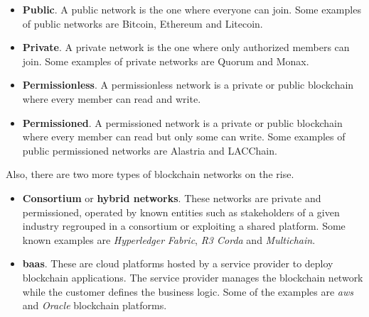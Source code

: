 \begin{itemize}
    \item \textbf{Public}. A public network is the one where everyone can join. Some examples of public networks are Bitcoin, Ethereum and Litecoin.
    \item \textbf{Private}. A private network is the one where only authorized members can join. Some examples of private networks are Quorum and Monax.
    \item \textbf{Permissionless}. A permissionless network is a private or public blockchain where every member can read and write.
    \item \textbf{Permissioned}. A permissioned network is a private or public blockchain where every member can read but only some can write. Some examples of public permissioned networks are Alastria and LACChain.
\end{itemize}
Also, there are two more types of blockchain networks on the rise.
\begin{itemize}
    \item \textbf{Consortium} or \textbf{hybrid networks}. These networks are private and permissioned, operated by known entities such as stakeholders of a given industry regrouped in a consortium or exploiting a shared platform. Some known examples are \textit{Hyperledger} \textit{Fabric}, \textit{R3 Corda} and \textit{Multichain}.
    \item \textbf{\acrfull{baas}}. These are cloud platforms hosted by a service provider to deploy blockchain applications. The service provider manages the blockchain network while the customer defines the business logic. Some of the examples are \textit{\acrfull{aws}} and \textit{Oracle} blockchain platforms.
\end{itemize}

